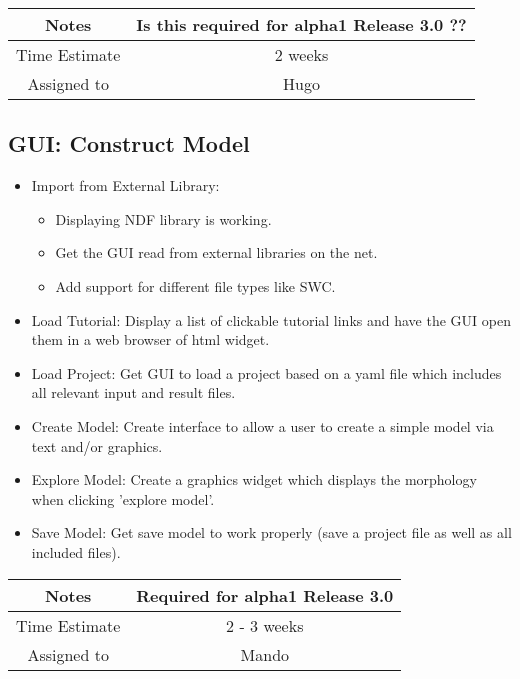 \documentclass[12pt]{article}
\begin{document}
{
  \vspace{5mm}
  \centering
  \begin{tabular}{|c|c|}
    \hline
    Notes
    & Is this required for alpha1 Release 3.0 ?? \\
    \hline
    Time Estimate
    & 2 weeks \\
    \hline
    Assigned to
    & Hugo \\
    \hline
  \end{tabular}
}


\subsection{GUI: Construct Model}

\begin{itemize}
\item Import from External Library:
  \begin{itemize}
  \item Displaying NDF library is working.
  \item Get the GUI read from external libraries on the net.
  \item Add support for different file types like SWC.
  \end{itemize}
\item Load Tutorial: Display a list of clickable tutorial links and
  have the GUI open them in a web browser of html widget.
\item Load Project: Get GUI to load a project based on a yaml file
  which includes all relevant input and result files.
\item Create Model: Create interface to allow a user to create a
  simple model via text and/or graphics.
\item Explore Model: Create a graphics widget which displays the
  morphology when clicking 'explore model'.
\item Save Model: Get save model to work properly (save a project file
  as well as all included files).
\end{itemize}

{
  \vspace{5mm}
  \centering
  \begin{tabular}{|c|c|}
    \hline
    Notes
    & Required for alpha1 Release 3.0 \\
    \hline
    Time Estimate
    & 2 - 3 weeks \\
    \hline
    Assigned to
    & Mando \\
    \hline
  \end{tabular}
}
\end{document}

